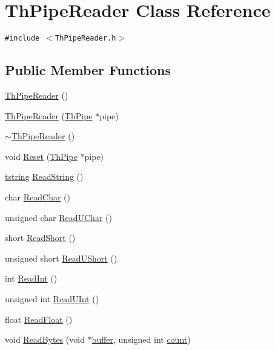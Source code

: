 \hypertarget{class_th_pipe_reader}{
\section{ThPipeReader Class Reference}
\label{class_th_pipe_reader}
}
{\tt \#include $<$ThPipeReader.h$>$}

\subsection*{Public Member Functions}
\begin{CompactItemize}
\item 
\hyperlink{class_th_pipe_reader_66a72a215e2e5c9cd7baa25c62b869c2}{ThPipeReader} ()
\item 
\hyperlink{class_th_pipe_reader_b3bc38f4d40642940d678769b0c53b79}{ThPipeReader} (\hyperlink{class_th_pipe}{ThPipe} $\ast$pipe)
\item 
\hyperlink{class_th_pipe_reader_a81fc061dec7eb3b48b216679288ddb8}{$\sim$ThPipeReader} ()
\item 
void \hyperlink{class_th_pipe_reader_b8e2c24b096dd07d26e40da1bdd8e129}{Reset} (\hyperlink{class_th_pipe}{ThPipe} $\ast$pipe)
\item 
\hyperlink{common__afx_8h_816fa58fd77499b0edb2c69ebe803d5c}{tstring} \hyperlink{class_th_pipe_reader_1613d62288c1ca43e69b28ec6b1426dd}{ReadString} ()
\item 
char \hyperlink{class_th_pipe_reader_bfd9f2de05e08aac9281789a1de3ae26}{ReadChar} ()
\item 
unsigned char \hyperlink{class_th_pipe_reader_d8bad1a098466c6ce11053b38ff31df5}{ReadUChar} ()
\item 
short \hyperlink{class_th_pipe_reader_ad9c0b0d4f1e4a79509863d1a8f824fd}{ReadShort} ()
\item 
unsigned short \hyperlink{class_th_pipe_reader_c632e10f9d824076c8716b7daf928dc8}{ReadUShort} ()
\item 
int \hyperlink{class_th_pipe_reader_9ac28a28529feee55e127fbf3b5dbde3}{ReadInt} ()
\item 
unsigned int \hyperlink{class_th_pipe_reader_ca013702f2bf2a42d90d568d09fa10f9}{ReadUInt} ()
\item 
float \hyperlink{class_th_pipe_reader_0133c2b00c5ce367620c111c35fce496}{ReadFloat} ()
\item 
void \hyperlink{class_th_pipe_reader_ec4e943c71ffb3f29b07129fb2285cac}{ReadBytes} (void $\ast$\hyperlink{glext__bak_8h_c4fdb15bdbcd63430bab668b5419ed9f}{buffer}, unsigned int \hyperlink{wglext_8h_98d18d6b4e3ba4ed266c6fb54c839d70}{count})

\end{CompactItemize}

